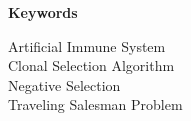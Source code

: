 %
%
% 
% 
% 

\begin{center}
{\Large\bfseries Keywords}
\end{center}

\noindent
Artificial Immune System\\
Clonal Selection Algorithm\\
Negative Selection\\
Traveling Salesman Problem\\

